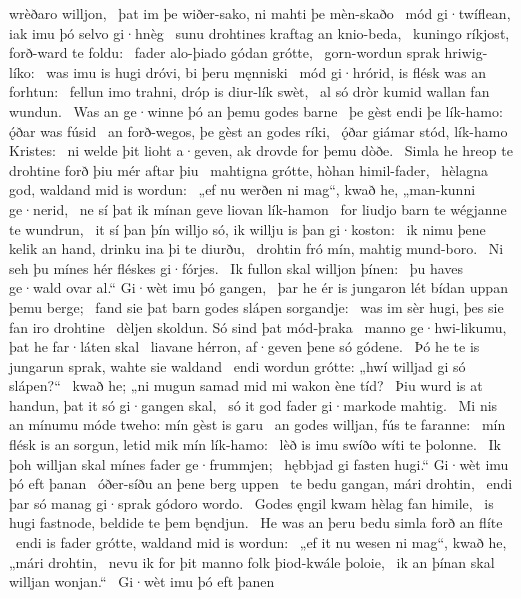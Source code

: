 wrèðaro willjon, \hld\ þat im þe wiðer-sako,
ni mahti þe mèn-skaðo \hld\ mód gi·twíflean,
iak imu þó selvo gi·hnèg \hld\ sunu drohtines
kraftag an knio-beda, \hld\ kuningo ríkjost,
forð-ward te foldu: \hld\ fader alo-þiado
gódan grótte, \hld\ gorn-wordun sprak
hriwig-líko: \hld\ was imu is hugi dróvi,
bi þeru męnniski \hld\ mód gi·hrórid,
is flésk was an forhtun: \hld\ fellun imo trahni,
dróp is diur-lík swèt, \hld\ al só dròr kumid
wallan fan wundun. \hld\ Was an ge·winne þó
an þemu godes barne \hld\ þe gèst endi þe lík-hamo:
ǫ́ðar was fúsid \hld\ an forð-wegos,
þe gèst an godes ríki, \hld\ ǫ́ðar giámar stód,
lík-hamo Kristes: \hld\ ni welde þit lioht a·geven,
ak drovde for þemu dòðe. \hld\ Simla he hreop te drohtine forð
þiu mér aftar þiu \hld\ mahtigna grótte,
hòhan himil-fader, \hld\ hèlagna god,
waldand mid is wordun: \hld\ „ef nu werðen ni mag“, kwað he,
„man-kunni ge·nerid, \hld\ ne sí þat ik mínan geve
liovan lík-hamon \hld\ for liudjo barn
te wégjanne te wundrun, \hld\ it sí þan þín willjo só,
ik willju is þan gi·koston: \hld\ ik nimu þene kelik an hand,
drinku ina þi te diurðu, \hld\ drohtin fró mín,
mahtig mund-boro. \hld\ Ni seh þu mínes hér
fléskes gi·fórjes. \hld\ Ik fullon skal
willjon þínen: \hld\ þu haves ge·wald ovar al.“
Gi·wèt imu þó gangen, \hld\ þar he ér is jungaron lét
bídan uppan þemu berge; \hld\ fand sie þat barn godes
slápen sorgandje: \hld\ was im sèr hugi,
þes sie fan iro drohtine \hld\ dèljen skoldun.
Só sind þat mód-þraka \hld\ manno ge·hwi-likumu,
þat he far·láten skal \hld\ liavane hérron,
af·geven þene só gódene. \hld\ Þó he te is jungarun sprak,
wahte sie waldand \hld\ endi wordun grótte:
„hwí willjad gi só slápen?“ \hld\ kwað he; „ni mugun samad mid mi
wakon ène tíd? \hld\ Þiu wurd is at handun,
þat it só gi·gangen skal, \hld\ só it god fader
gi·markode mahtig. \hld\ Mi nis an mínumu móde tweho:
mín gèst is garu \hld\ an godes willjan,
fús te faranne: \hld\ mín flésk is an sorgun,
letid mik mín lík-hamo: \hld\ lèð is imu swíðo
wíti te þolonne. \hld\ Ik þoh willjan skal
mínes fader ge·frummjen; \hld\ hębbjad gi fasten hugi.“
Gi·wèt imu þó eft þanan \hld\ óðer-síðu
an þene berg uppen \hld\ te bedu gangan,
mári drohtin, \hld\ endi þar só manag gi·sprak
gódoro wordo. \hld\ Godes ęngil kwam
hèlag fan himile, \hld\ is hugi fastnode,
beldide te þem bęndjun. \hld\ He was an þeru bedu simla
forð an flíte \hld\ endi is fader grótte,
waldand mid is wordun: \hld\ „ef it nu wesen ni mag“, kwað he,
„mári drohtin, \hld\ nevu ik for þit manno folk
þiod-kwále þoloie, \hld\ ik an þínan skal
willjan wonjan.“ \hld\ Gi·wèt imu þó eft þanen
